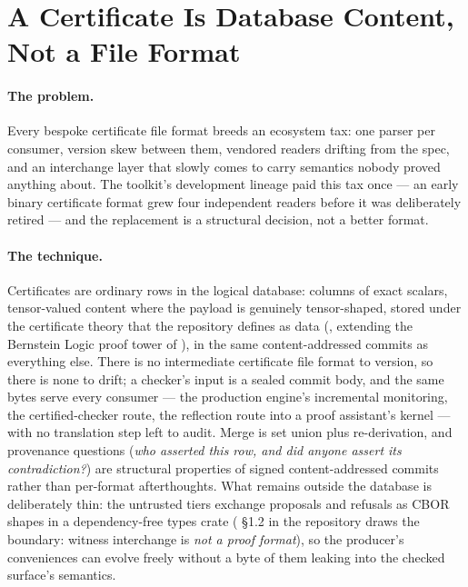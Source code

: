 \section{A Certificate Is Database Content, Not a File Format}
\label{sec:pearl-cert-rows}

\paragraph{The problem.} Every bespoke certificate file format breeds
an ecosystem tax: one parser per consumer, version skew between them,
vendored readers drifting from the spec, and an interchange layer that
slowly comes to carry semantics nobody proved anything about.
The toolkit's development lineage paid this tax once --- an early
binary certificate format grew four independent readers before it was
deliberately retired --- and the replacement is a structural decision,
not a better format.

\paragraph{The technique.} Certificates are ordinary rows in the
logical database: columns of exact scalars, tensor-valued content
where the payload is genuinely tensor-shaped, stored under the
certificate theory that the  repository defines as data
(, extending the Bernstein Logic proof
tower of ), in the
same content-addressed commits as everything else. There is no
intermediate certificate file format to version, so there is none to
drift; a checker's input is a sealed commit body, and the same bytes
serve every consumer --- the production engine's incremental
monitoring, the certified-checker route, the reflection route into a
proof assistant's kernel --- with no translation step left to audit.
Merge is set union plus re-derivation, and provenance questions
(\emph{who asserted this row, and did anyone assert its
contradiction?}) are structural properties of signed content-addressed
commits rather than per-format afterthoughts. What remains outside the
database is deliberately thin: the untrusted tiers exchange proposals
and refusals as CBOR shapes in a dependency-free types crate
( \S1.2 in the  repository draws the
boundary: witness interchange is \emph{not a proof format}), so the
producer's conveniences can evolve freely without a byte of them
leaking into the checked surface's semantics.

